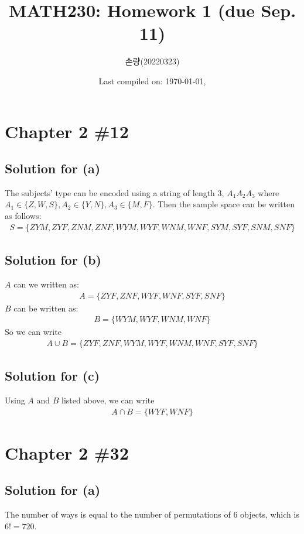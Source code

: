 \documentclass{scrartcl}
\title{MATH230: Homework 1 (due Sep. 11)}
\author{손량(20220323)}
\date{Last compiled on: \today, \currenttime}
\begin{document}
\maketitle

\section{Chapter 2 \#12}

\subsection{Solution for (a)}
The subjects' type can be encoded using a string of length 3, \(A_1 A_2 A_3\)
where \(A_1 \in \{Z, W, S\}, A_2 \in \{Y, N\}, A_3 \in \{M, F\}\). Then the
sample space can be written as follows:
\begin{align*}
  S = \{ZYM, ZYF, ZNM, ZNF, WYM, WYF, WNM, WNF, SYM, SYF, SNM, SNF\}
\end{align*}

\subsection{Solution for (b)}
\(A\) can we written as:
\begin{align*}
  A = \{ZYF, ZNF, WYF, WNF, SYF, SNF\}
\end{align*}
\(B\) can be written as:
\begin{align*}
  B = \{WYM, WYF, WNM, WNF\}
\end{align*}
So we can write
\begin{align*}
  A \cup B = \{ZYF, ZNF, WYM, WYF, WNM, WNF, SYF, SNF\}
\end{align*}

\subsection{Solution for (c)}
Using \(A\) and \(B\) listed above, we can write
\begin{align*}
  A \cap B = \{WYF, WNF\}
\end{align*}

\section{Chapter 2 \#32}
\subsection{Solution for (a)}
The number of ways is equal to the number of permutations of 6 objects, which
is \(6! = 720\).
\end{document}
